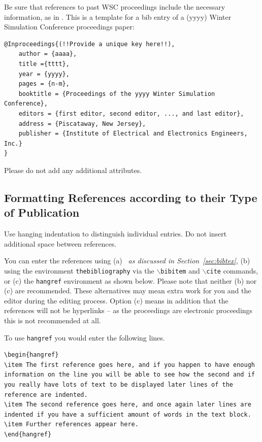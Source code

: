 \documentclass{article}
\begin{document}
Be sure that references to past WSC proceedings include the necessary information, as in . 
This is a template for a bib entry of a (yyyy) Winter Simulation Conference proceedings paper:\newline

\begin{verbatim}
@Inproceedings{(!!Provide a unique key here!!),
	author = {aaaa},
	title ={tttt},
	year = {yyyy},
	pages = {n-m},
	booktitle = {Proceedings of the yyyy Winter Simulation Conference},
	editors = {first editor, second editor, ..., and last editor},
	address = {Piscataway, New Jersey},
	publisher = {Institute of Electrical and Electronics Engineers, Inc.}
}
\end{verbatim}\vspace{5mm}

Please do not add any additional attributes.


\subsection{Formatting References according to their Type of Publication}

Use hanging indentation to distinguish individual entries. Do not insert additional space between references.

You can enter the references using (a) {\em \BibTeX\ as discussed in Section~\ref{sec:bibtex}}, (b) using the environment {\tt thebibliography} via the {\tt $\backslash$bibitem} and {\tt $\backslash$cite} commands, or (c) the {\tt hangref} environment as shown below.
Please note that neither (b) nor (c) are recommended. These alternatives may mean extra work for you and the editor during the editing process. Option (c) means in addition that the references will not be hyperlinks -- as the proceedings are electronic proceedings this is not recommended at all.

To use {\tt hangref} you would enter the following lines.\newline

\begin{verbatim}
\begin{hangref}
\item The first reference goes here, and if you happen to have enough 
information on the line you will be able to see how the second and if
you really have lots of text to be displayed later lines of the
reference are indented.
\item The second reference goes here, and once again later lines are
indented if you have a sufficient amount of words in the text block.
\item Further references appear here.
\end{hangref}
\end{verbatim}\vspace{4mm}
\end{document}
